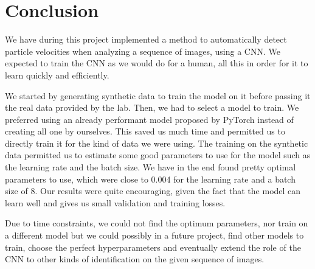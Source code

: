 \documentclass[10pt,conference]{IEEEtran}
\begin{document}
\section{Conclusion}
We have during this project implemented a method to automatically detect particle velocities when analyzing a sequence of images, using a CNN. We expected to train the CNN as we would do for a human, all this in order for it to learn quickly and efficiently.\par
We started by generating synthetic data to train the model on it before passing it the real data provided by the lab. Then, we had to select a model to train. We preferred using an already performant model proposed by PyTorch instead of creating all one by ourselves. This saved us much time and permitted us to directly train it for the kind of data we were using. The training on the synthetic data permitted us to estimate some good parameters to use for the model such as the learning rate and the batch size. We have in the end found pretty optimal parameters to use, which were close to 0.004 for the learning rate and a batch size of 8. Our results were quite encouraging, given the fact that the model can learn well and gives us small validation and training losses.\par
Due to time constraints, we could not find the optimum parameters, nor train on a different model but we could possibly in a future project, find other models to train, choose the perfect hyperparameters and eventually extend the role of the CNN to other kinds of identification on the given sequence of images.



\end{document}
